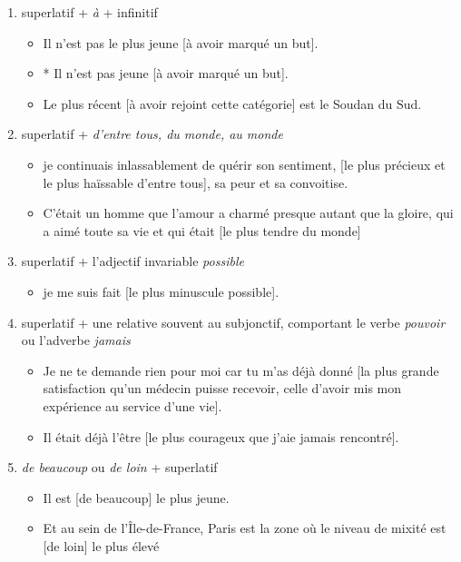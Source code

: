 \documentclass[UTF8]{report}
\begin{document}
\begin{enumerate}
    \item superlatif + \textit{à} + infinitif 
    \begin{itemize}
        \item Il n’est pas le plus jeune [à avoir marqué un but].
        \item * Il n’est pas jeune [à avoir marqué un but].
        \item Le plus récent [à avoir rejoint cette catégorie] est le Soudan du Sud.
    \end{itemize}
    \item superlatif + \textit{d’entre tous, du monde, au monde}
    \begin{itemize}
        \item je continuais inlassablement de quérir son sentiment, [le plus précieux et le plus haïssable d’entre tous], sa peur et sa convoitise. 
        \item C’était un homme que l’amour a charmé presque autant que la gloire, qui a aimé toute sa vie et qui était [le plus tendre du monde]
    \end{itemize}
    \item superlatif + l’adjectif invariable \textit{possible}
    \begin{itemize}
        \item je me suis fait [le plus minuscule possible]. 
    \end{itemize}
    \item superlatif + une relative souvent au subjonctif, comportant le verbe \textit{pouvoir} ou l’adverbe \textit{jamais}
    \begin{itemize}
        \item Je ne te demande rien pour moi car tu m’as déjà donné [la plus grande satisfaction qu’un médecin puisse recevoir, celle d’avoir mis mon expérience au service d’une vie].
        \item Il était déjà l’être [le plus courageux que j’aie jamais rencontré].
    \end{itemize}
    \item \textit{de beaucoup} ou \textit{de loin} + superlatif
    \begin{itemize}
        \item Il est [de beaucoup] le plus jeune.
        \item Et au sein de l’Île-de-France, Paris est la zone où le niveau de mixité est [de loin] le plus élevé
    \end{itemize}
\end{enumerate}
\end{document}
